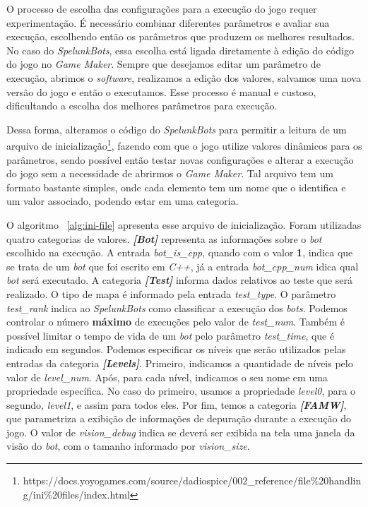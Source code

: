 O processo de escolha das configurações para a execução do jogo requer
experimentação. É necessário combinar diferentes parâmetros e avaliar sua
execução, escolhendo então os parâmetros que produzem os melhores resultados.
No caso do \textit{SpelunkBots}, essa escolha está ligada diretamente à edição
do código do jogo no \textit{Game Maker}. Sempre que desejamos editar um
parâmetro de execução, abrimos o \textit{software}, realizamos a edição dos
valores, salvamos uma nova versão do jogo e então o executamos. Esse processo é
manual e custoso, dificultando a escolha dos melhores parâmetros para execução.  

Dessa forma, alteramos o código do \textit{SpelunkBots} para permitir a leitura
de um arquivo de
inicialização\footnote{https://docs.yoyogames.com/source/dadiospice/002\_reference/file\%20handling/ini\%20files/index.html},
fazendo com que o jogo utilize valores dinâmicos para os parâmetros, sendo
possível então testar novas configurações e alterar a execução do jogo sem
a necessidade de abrirmos o \textit{Game Maker}. Tal arquivo tem um formato
bastante simples, onde cada elemento tem um nome que o identifica e um
valor associado, podendo estar em uma categoria.

O algoritmo ~\ref{alg:ini-file} apresenta esse arquivo de inicialização. Foram
utilizadas quatro categorias de valores. \textit{\textbf{[Bot]}} representa as
informações sobre o \textit{bot} escolhido na execução. A entrada
\textit{bot\_is\_cpp}, quando com o valor \textbf{1}, indica que se trata de um
\textit{bot} que foi escrito em \textit{C++}, já a entrada
\textit{bot\_cpp\_num} idica qual \textit{bot} será executado.  A categoria
\textit{\textbf{[Test]}} informa dados relativos ao teste que será realizado. O
tipo de mapa é informado pela entrada \textit{test\_type}. O parâmetro
\textit{test\_rank} indica ao \textit{SpelunkBots} como classificar a execução
dos \textit{bots}. Podemos controlar o número \textbf{máximo} de execuções pelo
valor de \textit{test\_num}. Também é possível limitar o tempo de vida de um
\textit{bot} pelo parâmetro \textit{test\_time}, que é indicado em segundos.
Podemos especificar os níveis que serão utilizados pelas entradas da categoria
\textit{\textbf{[Levels]}}. Primeiro, indicamos a quantidade de níveis pelo
valor de \textit{level\_num}. Após, para cada nível, indicamos o seu nome em
uma propriedade específica. No caso do primeiro, usamos a propriedade
\textit{level0}, para o segundo, \textit{level1}, e assim para todos eles.  Por
fim, temos a categoria \textit{\textbf{[FAMW]}}, que parametriza a exibição de
informações de depuração durante a execução do jogo.  O valor de
\textit{vision\_debug} indica se deverá ser exibida na tela uma janela da visão
do \textit{bot}, com o tamanho informado por \textit{vision\_size}.

